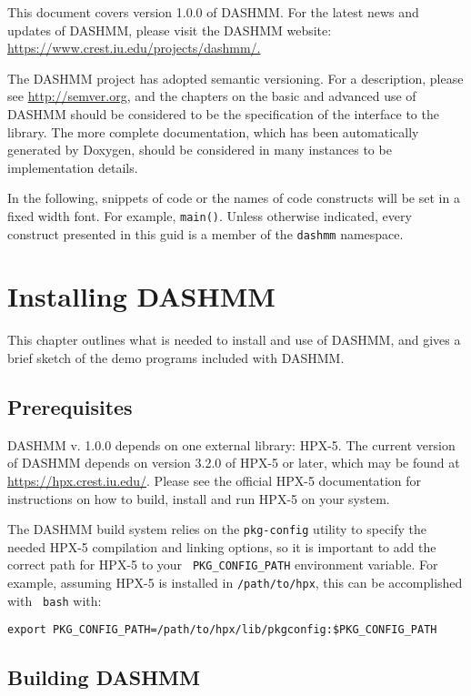 \documentclass[11pt]{book}
\begin{document}
This document covers version 1.0.0 of DASHMM. For the latest news and
updates of DASHMM, please visit the DASHMM website:
\url{https://www.crest.iu.edu/projects/dashmm/.} 

The DASHMM project has adopted semantic versioning. For a description,
please see \url{http://semver.org}, and the chapters on the basic and
advanced use of DASHMM should be considered to be the specification of
the interface to the library. The more complete documentation, which
has been automatically generated by Doxygen, should be considered in
many instances to be implementation details. 

In the following, snippets of code or the names of code constructs
will be set in a fixed width font. For example, {\tt main()}. Unless
otherwise indicated, every construct presented in this guid is a
member of the {\tt dashmm} namespace. 


\chapter{Installing DASHMM} 

This chapter outlines what is needed to install and use of DASHMM, and
gives a brief sketch of the demo programs included with DASHMM. 

\section{Prerequisites} 

DASHMM v. 1.0.0 depends on one external library: HPX-5. The current
version of DASHMM depends on version 3.2.0 of HPX-5 or later, which
may be found at \url{https://hpx.crest.iu.edu/}. Please see the
official HPX-5 documentation for instructions on how to build, install
and run HPX-5 on your system. 

The DASHMM build system relies on the {\tt pkg-config} utility to
specify the needed HPX-5 compilation and linking options, so it is
important to add the correct path for HPX-5 to your {\tt
  PKG\_CONFIG\_PATH} environment variable. For example, assuming HPX-5
is installed in {\tt /path/to/hpx}, this can be accomplished with {\tt
  bash} with: 

\begin{verbatim} 
export PKG_CONFIG_PATH=/path/to/hpx/lib/pkgconfig:$PKG_CONFIG_PATH
\end{verbatim} 

\section{Building DASHMM} 
\end{document}
